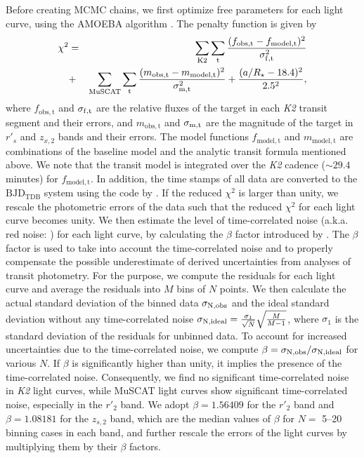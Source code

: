 \documentclass[]{pasj01}
\begin{document}
Before creating MCMC chains, we first optimize free parameters for each light curve,
using the AMOEBA algorithm \citep{1992nrca.book.....P}.
The penalty function is given by
\begin{eqnarray*}
\label{eq:chisq}
\chi^2 &=& \sum_{\rm K2}\sum_{\rm t}\frac{(f_\mathrm{obs,t}-f_\mathrm{model,t})^2}{\sigma_{\rm f,t}^{2}}\\
&+& \sum_{\rm MuSCAT}\sum_{\rm t}\frac{(m_\mathrm{obs,t}-m_\mathrm{model,t})^2}{\sigma_{\rm m,t}^{2}}
+ \frac{(a/R_\star - 18.4)^2}{2.5^2},
\end{eqnarray*}
where $f_\mathrm{obs,t}$ and $\sigma_{\rm f,t}$ are
the relative fluxes of the target in each {\it K2} transit segment and their errors, and
$m_\mathrm{obs,t}$ and $\sigma_{\rm m,t}$ are
the magnitude of the target in $r'_s$ and $z_{x,2}$ bands and their errors.
The model functions $f_\mathrm{model,t}$ and $m_\mathrm{model,t}$
are combinations of the baseline model and the analytic transit formula mentioned above.
We note that the transit model is integrated over the {\it K2} cadence
($\sim 29.4$ minutes) for $f_\mathrm{model,t}$.
In addition, the time stamps of all data are converted to the $\mathrm{BJD_{TDB}}$ system
using the code by \citet{2010PASP..122..935E}.
If the reduced $\chi^2$ is larger than unity, we rescale the photometric errors of the data
such that the reduced $\chi^2$ for each light curve becomes unity.
We then estimate the level of time-correlated noise
(a.k.a. red noise: \cite{2006MNRAS.373..231P}) for each light curve,
by calculating the $\beta$ factor introduced by \citet{2008ApJ...683.1076W}.
The $\beta$ factor is used to take into account the time-correlated noise and
to properly compensate the possible underestimate of derived uncertainties
from analyses of transit photometry.
For the purpose, we compute the residuals for each light curve
and average the residuals into $M$ bins of $N$ points.
We then calculate the actual standard deviation of the binned data
$\sigma_{{\rm N,obs}}$ and the ideal standard deviation without any time-correlated noise
$\sigma_{{\rm N,ideal}} = \frac{\sigma_1}{\sqrt{N}} \sqrt{\frac{M}{M-1}}$,
where $\sigma_1$ is the standard deviation of the residuals for unbinned data.
To account for increased uncertainties due to the time-correlated noise,
we compute $\beta = \sigma_{{\rm N,obs}}/\sigma_{{\rm N,ideal}}$
for various $N$.
If $\beta$ is significantly higher than unity, it implies the presence of the time-correlated noise.
Consequently,
we find no significant time-correlated noise in {\it K2} light curves,
while MuSCAT light curves show significant time-correlated noise, especially in the $r'_2$ band.
We adopt $\beta = 1.56409$ for the $r'_2$ band and
$\beta = 1.08181$ for the $z_{s,2}$ band,
which are the median values of $\beta$ for $N=$ 5--20 binning cases in each band,
and further rescale the errors of the light curves by multiplying them by their $\beta$ factors.
\end{document}
